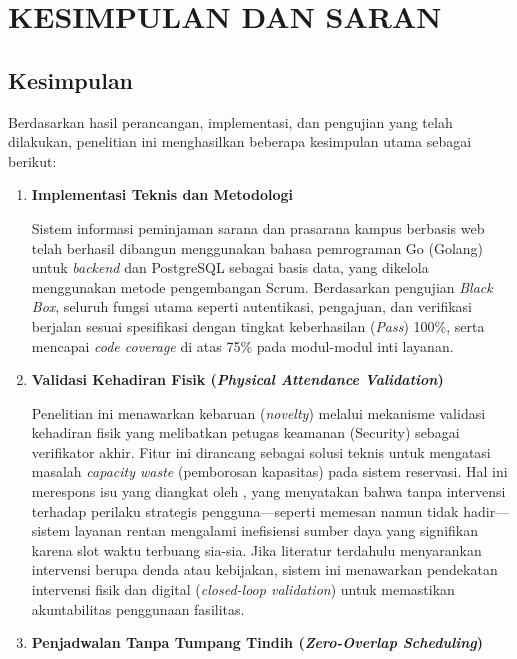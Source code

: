 \chapter{KESIMPULAN DAN SARAN}

\section{Kesimpulan}
Berdasarkan hasil perancangan, implementasi, dan pengujian yang telah dilakukan, penelitian ini menghasilkan beberapa kesimpulan utama sebagai berikut:

\begin{enumerate}
    \item \textbf{Implementasi Teknis dan Metodologi}
    
    Sistem informasi peminjaman sarana dan prasarana kampus berbasis web telah berhasil dibangun menggunakan bahasa pemrograman Go (Golang) untuk \textit{backend} dan PostgreSQL sebagai basis data, yang dikelola menggunakan metode pengembangan Scrum. Berdasarkan pengujian \textit{Black Box}, seluruh fungsi utama seperti autentikasi, pengajuan, dan verifikasi berjalan sesuai spesifikasi dengan tingkat keberhasilan (\textit{Pass}) 100\%, serta mencapai \textit{code coverage} di atas 75\% pada modul-modul inti layanan.

    \item \textbf{Validasi Kehadiran Fisik (\textit{Physical Attendance Validation})}
    
    Penelitian ini menawarkan kebaruan (\textit{novelty}) melalui mekanisme validasi kehadiran fisik yang melibatkan petugas keamanan (Security) sebagai verifikator akhir. Fitur ini dirancang sebagai solusi teknis untuk mengatasi masalah \textit{capacity waste} (pemborosan kapasitas) pada sistem reservasi. Hal ini merespons isu yang diangkat oleh \textcite{Baron}, yang menyatakan bahwa tanpa intervensi terhadap perilaku strategis pengguna---seperti memesan namun tidak hadir---sistem layanan rentan mengalami inefisiensi sumber daya yang signifikan karena slot waktu terbuang sia-sia. Jika literatur terdahulu menyarankan intervensi berupa denda atau kebijakan, sistem ini menawarkan pendekatan intervensi fisik dan digital (\textit{closed-loop validation}) untuk memastikan akuntabilitas penggunaan fasilitas.

    \item \textbf{Penjadwalan Tanpa Tumpang Tindih (\textit{Zero-Overlap Scheduling})}
    

\end{enumerate}
